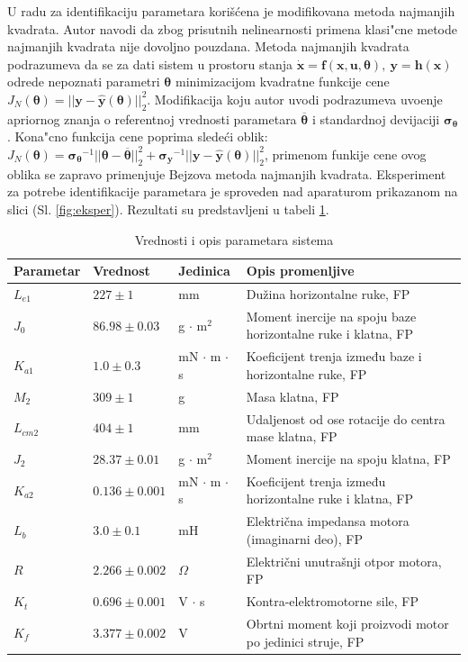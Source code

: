 \documentclass[a4paper,11pt]{article}
\theoremstyle{definition} \newtheorem{deff}{Definicija}[section]
\theoremstyle{definition} \newtheorem{prim}[deff]{Primer}
\theoremstyle{plain} \newtheorem{teor}[deff]{Teorema}
\newcommand{\vect}[1]{\boldsymbol{\mathbf{#1}}}
\begin{document}
	U radu \cite{inicijalna} za identifikaciju parametara korišćena je modifikovana metoda najmanjih kvadrata. Autor navodi da zbog prisutnih nelinearnosti primena klasi"cne metode najmanjih kvadrata nije dovoljno pouzdana. Metoda najmanjih kvadrata podrazumeva da se za dati sistem u prostoru stanja $\dot{\mathbf{x}} = \mathbf{f}(\mathbf{x}, \mathbf{u}, \vect{\theta}),~ \mathbf{y} = \mathbf{h}(\mathbf{x})$ odrede nepoznati parametri $\vect{\theta}$ minimizacijom kvadratne funkcije cene $J_N(\vect{\theta}) = ||\mathbf{y}-\hat{\mathbf{y}}(\vect{\theta})||^2_2$. Modifikacija koju autor uvodi podrazumeva uvo\dj enje apriornog znanja o referentnoj vrednosti parametara $\vect{\overline{\theta}}$ i standardnoj devijaciji $\vect{\sigma_{\vect{\theta}}}$. Kona"cno funkcija cene poprima slede\'ci oblik: $J_N(\vect{\theta}) = \vect{\sigma_{\vect{\theta}}}^{-1}||\vect{\theta}-\vect{\overline{\theta}}||^2_2 +  \vect{\sigma_{\vect{y}}}^{-1}||\mathbf{y}-\hat{\mathbf{y}}(\vect{\theta})||^2_2$, primenom funkije cene ovog oblika se zapravo primenjuje Bejzova metoda najmanjih kvadrata. Eksperiment za potrebe identifikacije parametara je sproveden nad aparaturom prikazanom na slici (Sl. \ref{fig:eksper}). Rezultati su predstavljeni u tabeli \ref{tab:tab1}.
	
	\begin{table}[ht]
		\centering
		\caption{Vrednosti i opis parametara sistema}
		\begin{tabular}{l l l l}
			\toprule
			Parametar & Vrednost & Jedinica & Opis promenljive \\
			\midrule
			$L_{e1}$ & $227 \pm 1$ & mm & Dužina horizontalne ruke, FP \\
			$J_0$ & $86.98 \pm 0.03$ & g $\cdot$ m$^2$ & Moment inercije na spoju baze horizontalne ruke i klatna, FP \\
			$K_{a1}$ & $1.0 \pm 0.3$ & mN $\cdot$ m $\cdot$ s & Koeficijent trenja između baze i horizontalne ruke, FP \\
			$M_2$ & $309 \pm 1$ & g & Masa klatna, FP \\
			$L_{cm2}$ & $404 \pm 1$ & mm & Udaljenost od ose rotacije do centra mase klatna, FP \\
			$J_2$ & $28.37 \pm 0.01$ & g $\cdot$ m$^2$ & Moment inercije na spoju klatna, FP \\
			$K_{a2}$ & $0.136 \pm 0.001$ & mN $\cdot$ m $\cdot$ s & Koeficijent trenja između horizontalne ruke i klatna, FP \\
			$L_b$ & $3.0 \pm 0.1$ & mH & Električna impedansa motora (imaginarni deo), FP \\
			$R$ & $2.266 \pm 0.002$ & $\Omega$ & Električni unutrašnji otpor motora, FP \\
			$K_t$ & $0.696 \pm 0.001$ & V $\cdot$ s & Kontra-elektromotorne sile, FP \\
			$K_f$ & $3.377 \pm 0.002$ & V & Obrtni moment koji proizvodi motor po jedinici struje, FP \\
			\bottomrule
		\end{tabular}
		\label{tab:tab1}
	\end{table}
	
\end{document}
